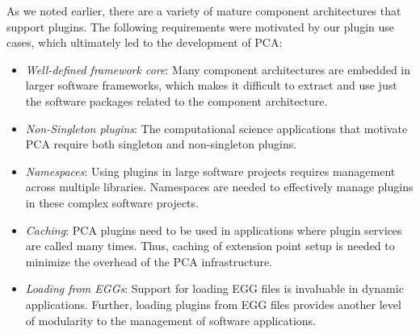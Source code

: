 As we noted earlier, there are a variety of mature component architectures
that support plugins.  The following requirements were motivated by our
plugin use cases, which ultimately led to the development of PCA:
\begin{itemize}

\item \textit{Well-defined framework core}: Many component architectures
are embedded in larger software frameworks, which makes it difficult
to extract and use just the software packages related to the component
architecture.

\item \textit{Non-Singleton plugins}:  The computational science
applications that motivate PCA require both singleton and non-singleton
plugins.

\item \textit{Namespaces}:  Using plugins in large software projects
requires management across multiple libraries.  Namespaces are needed
to effectively manage plugins in these complex software projects.

\item \textit{Caching}:  PCA plugins need to be used in applications
where plugin services are called many times.  Thus, caching of extension
point setup is needed to minimize the overhead of the PCA infrastructure.

\item \textit{Loading from EGGs}:  Support for loading EGG files is
invaluable in dynamic applications.  Further, loading plugins from EGG
files provides another level of modularity to the management of software
applications.

\end{itemize}


